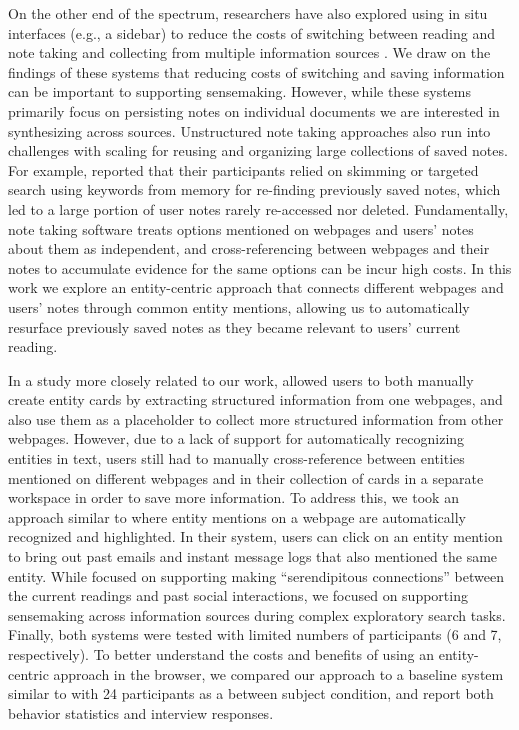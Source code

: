 On the other end of the spectrum, researchers have also explored using in situ interfaces (e.g., a sidebar) to reduce the costs of switching between reading and note taking and collecting from multiple information sources \cite{romat2019spaceink,tashman2011liquidtext,notetoself,van2011finders}. We draw on the findings of these systems that reducing costs of switching and saving information can be important to supporting sensemaking. However, while these systems primarily focus on persisting notes on individual documents we are interested in synthesizing across sources. Unstructured note taking approaches also run into challenges with scaling for reusing and organizing large collections of saved notes.  For example, \cite{notetoself} reported that their participants relied on skimming or targeted search using keywords from memory for re-finding previously saved notes, which led to a large portion of user notes rarely re-accessed nor deleted. Fundamentally, note taking software treats options mentioned on webpages and users' notes about them as independent, and cross-referencing between webpages and their notes to accumulate evidence for the same options can be incur high costs. In this work we explore an entity-centric approach that connects different webpages and users' notes through common entity mentions, allowing us to automatically resurface previously saved notes as they became relevant to users' current reading.

In a study more closely related to our work, \cite{dontcheva2007relations} allowed users to both manually create entity cards by extracting structured information from one webpages, and also use them as a placeholder to collect more structured information from other webpages. However, due to a lack of support for automatically recognizing entities in text, users still had to manually cross-reference between entities mentioned on different webpages and in their collection of cards in a separate workspace in order to save more information. To address this, we took an approach similar to \cite{hangal2012effective} where entity mentions on a webpage are automatically recognized and highlighted. In their system, users can click on an entity mention to bring out past emails and instant message logs that also mentioned the same entity. While \cite{hangal2012effective} focused on supporting making ``serendipitous connections'' between the current readings and past social interactions, we focused on supporting sensemaking across information sources during complex exploratory search tasks. Finally, both systems were tested with limited numbers of participants (6 and 7, respectively). To better understand the costs and benefits of using an entity-centric approach in the browser, we compared our approach to a baseline system similar to \cite{notetoself} with 24 participants as a between subject condition, and report both behavior statistics and interview responses.

